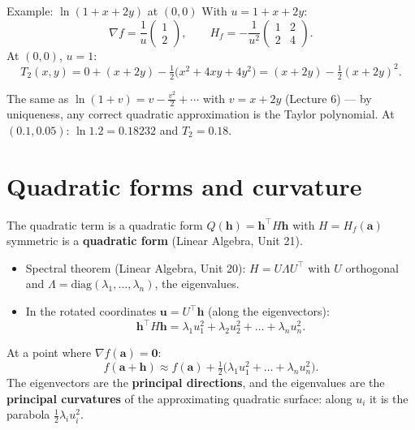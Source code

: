 \documentclass[10pt]{wosm-slides}
\newcommand{\va}{\mathbf{a}}
\newcommand{\vh}{\mathbf{h}}
\newcommand{\vu}{\mathbf{u}}
\begin{document}
\begin{frame}{Example: $\ln(1 + x + 2y)$ at $(0, 0)$}
  With $u = 1 + x + 2y$:
  \[ \nabla f = \frac{1}{u}\begin{pmatrix} 1 \\ 2 \end{pmatrix}, \qquad
     H_f = -\frac{1}{u^2}\begin{pmatrix} 1 & 2 \\ 2 & 4 \end{pmatrix} . \]
  \pause
  At $(0, 0)$, $u = 1$:
  \[ T_2(x, y) = 0 + (x + 2y) - \tfrac12\bigl(x^2 + 4xy + 4y^2\bigr) = (x + 2y) - \tfrac12 (x + 2y)^2 . \]
  \pause
  {\small The same as $\ln(1 + v) = v - \frac{v^2}{2} + \cdots$ with $v = x + 2y$ (Lecture 6) --- by
  uniqueness, any correct quadratic approximation is the Taylor polynomial. At $(0.1, 0.05)$:
  $\ln 1.2 = 0.18232$ and $T_2 = 0.18$.\par}
\end{frame}

\section{Quadratic forms and curvature}

\begin{frame}{The quadratic term is a quadratic form}
  $Q(\vh) = \vh^\top H \vh$ with $H = H_f(\va)$ symmetric is a \textbf{quadratic form} (Linear Algebra,
  Unit 21).
  \pause
  \begin{itemize}
    \item Spectral theorem (Linear Algebra, Unit 20): $H = U \Lambda U^\top$ with $U$ orthogonal and
      $\Lambda = \mathrm{diag}(\lambda_1, \dots, \lambda_n)$, the eigenvalues.
    \item In the rotated coordinates $\vu = U^\top \vh$ (along the eigenvectors):
      \[ \vh^\top H \vh = \lambda_1 u_1^2 + \lambda_2 u_2^2 + \dots + \lambda_n u_n^2 . \]
  \end{itemize}
  \pause
  At a point where $\nabla f(\va) = \mathbf 0$:
  \[ f(\va + \vh) \approx f(\va) + \tfrac12\bigl(\lambda_1 u_1^2 + \dots + \lambda_n u_n^2\bigr) . \]
  The eigenvectors are the \textbf{principal directions}, and the eigenvalues are the
  \textbf{principal curvatures} of the approximating quadratic surface: along $u_i$ it is the
  parabola $\frac12 \lambda_i u_i^2$.
\end{frame}
\end{document}
